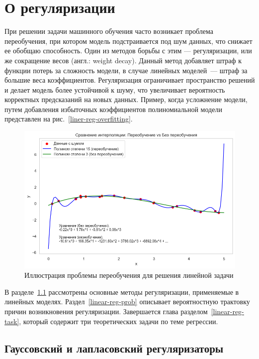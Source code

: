 
\section{О регуляризации}

При решении задачи машинного обучения часто возникает проблема переобучения, при котором модель подстраивается под шум данных, что снижает ее обобщаю способность. 
Один из методов борьбы с этим --- регуляризации, или же сокращение весов (англ.: weight decay). Данный метод добавляет штраф к функции потерь за сложность модели, в случае линейных моделей~--- штраф за большие веса коэффициентов. Регуляризация ограничивает пространство решений и делает модель более устойчивой к шуму, что увеличивает вероятность корректных предсказаний на новых данных. Пример, когда усложнение модели, путем добавления избыточных коэффициентов полиномиальной модели представлен на рис.~\ref{liner-reg-overfitting}.

\begin{figure}[h]
	\centering
	\includegraphics[width=0.9\linewidth]{chapters/linear/pics/reg-overfitting.png}
	\caption{Иллюстрация проблемы переобучения для решения линейной задачи}
	\label{linear-reg-overfitting}
\end{figure}

В разделе~\ref{linear-reg-l1l2} рассмотрены основные методы регуляризации, применяемые в линейных моделях. Раздел~\ref{linear-reg-prob} описывает вероятностную трактовку причин возникновения регуляризации. Завершается глава разделом~\ref{linear-reg-task}, который содержит три теоретических задачи по теме регрессии.

\subsection{Гауссовский и лапласовский регуляризаторы}
\label{linear-reg-l1l2}

